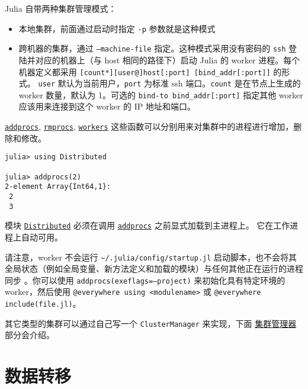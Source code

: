 Julia 自带两种集群管理模式：



\begin{itemize}
\item 本地集群，前面通过启动时指定 \texttt{-p} 参数就是这种模式


\item 跨机器的集群，通过 \texttt{--machine-file} 指定。这种模式采用没有密码的 \texttt{ssh} 登陆并对应的机器上（与 host 相同的路径下）启动 Julia 的 worker 进程。每个机器定义都采用 \texttt{[count*][user@]host[:port] [bind\_addr[:port]]} 的形式。 \texttt{user} 默认为当前用户，\texttt{port} 为标准 ssh 端口。\texttt{count} 是在节点上生成的 worker 数量，默认为 1。可选的 \texttt{bind-to bind\_addr[:port]} 指定其他 worker 应该用来连接到这个 worker 的 IP 地址和端口。

\end{itemize}


\hyperlink{2657399037748470653}{\texttt{addprocs}}, \hyperlink{16165500032398890398}{\texttt{rmprocs}}, \hyperlink{7474509137601932173}{\texttt{workers}} 这些函数可以分别用来对集群中的进程进行增加，删除和修改。




\begin{verbatim}
julia> using Distributed

julia> addprocs(2)
2-element Array{Int64,1}:
 2
 3
\end{verbatim}



模块 \hyperlink{11988382873486720115}{\texttt{Distributed}} 必须在调用 \hyperlink{2657399037748470653}{\texttt{addprocs}} 之前显式加载到主进程上。 它在工作进程上自动可用。



请注意，worker 不会运行 \texttt{{\textasciitilde}/.julia/config/startup.jl} 启动脚本，也不会将其全局状态（例如全局变量、新方法定义和加载的模块）与任何其他正在运行的进程同步 。你可以使用 \texttt{addprocs(exeflags={\textquotedbl}--project{\textquotedbl})} 来初始化具有特定环境的 worker，然后使用 \texttt{@everywhere using <modulename>} 或 \texttt{@everywhere include({\textquotedbl}file.jl{\textquotedbl})}。



其它类型的集群可以通过自己写一个 \texttt{ClusterManager} 来实现，下面 \hyperlink{8944798907386301797}{集群管理器} 部分会介绍。



\hypertarget{1534769292279176592}{}


\section{数据转移}



